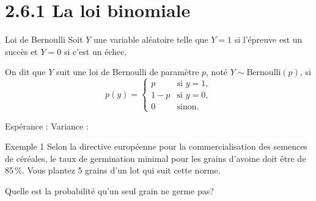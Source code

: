 \documentclass{BeamerTemplate}
\begin{document}
\section[Loi binomiale]{2.6.1 La loi binomiale}

\begin{frame}[t]{Loi de Bernoulli}
  Soit $Y$ une variable aléatoire telle que $Y = 1$ si l'épreuve est un succès
  et $Y = 0$ si c'est un échec.

  \begin{defn}
    On dit que $Y$ suit une \alert{loi de Bernoulli} de paramètre $p$, noté
    $Y \sim \text{Bernoulli}(p)$, si
    \[
      p(y) =
      \begin{cases}
        p & \text{si } y = 1, \\
        1 - p & \text{si } y = 0, \\
        0 & \text{sinon.}
      \end{cases}
    \]
  \end{defn}

  Espérance : \hspace{5cm} Variance :
\end{frame}

\begin{frame}[t]{Exemple 1}
  Selon la directive européenne pour la commercialisation des semences de
  céréales, le taux de germination minimal pour les grains d'avoine doit être
  de 85\,\%. Vous plantez 5 grains d'un lot qui suit cette norme.

  \medskip
  \alert{Quelle est la probabilité qu'un seul grain ne germe pas?}

  \medskip
\end{frame}
\end{document}
